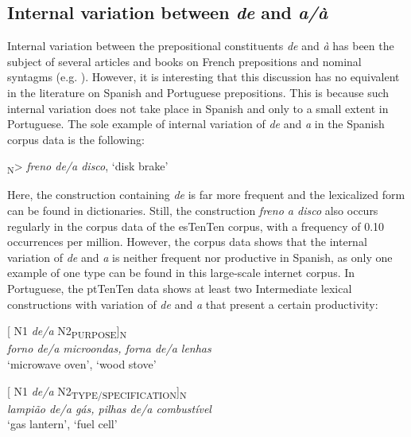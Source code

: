 \documentclass[output=paper]{langsci/langscibook}
\begin{document}
\subsection{Internal variation between \textit{de} and \textit{a/à}}

Internal variation between the prepositional constituents \textit{de} and \textit{à} has been the subject of several articles and books on French prepositions and nominal syntagms (e.g. \citealt{Anscombre:1990, Lang:1991, Bosredon:1991, Cadiot:1997}). However, it is interesting that this discussion has no equivalent in the literature on Spanish and Portuguese prepositions. This is because such internal variation does not take place in Spanish and only to a small extent in Portuguese. The sole example of internal variation of \textit{de} and \textit{a} in the Spanish corpus data is the following:

\ea{}\textsubscript{N}>		\textit{freno de/a disco},	`disk brake'\z

Here, the construction containing \textit{de} is far more frequent and the lexicalized form can be found in dictionaries. Still, the construction \textit{freno a disco} also occurs regularly in the corpus data of the esTenTen corpus, with a frequency of 0.10 occurrences per million. However, the corpus data shows that the internal variation of \textit{de} and \textit{a} is neither frequent nor productive in Spanish, as only one example of one type can be found in this large-scale internet corpus. In Portuguese, the ptTenTen data shows at least two Intermediate lexical constructions with variation of \textit{de} and \textit{a} that present a certain productivity:


\begin{minipage}{0.4\textwidth}    %
[ N1 \textit{de/a} N2\textsubscript{PURPOSE}]\textsubscript{N}\\
\textit{forno de/a microondas,  forna de/a lenhas}\\
`microwave oven',         `wood stove'

\end{minipage}
\hfill            %
\begin{minipage}{0.4\textwidth}
[ N1 \textit{de/a} N2\textsubscript{TYPE/SPECIFICATION}]\textsubscript{N}\\
\textit{lampião de/a gás,   pilhas de/a combustível }\\
`gas lantern',           `fuel cell'
\end{minipage} \\
\\
\end{document}
